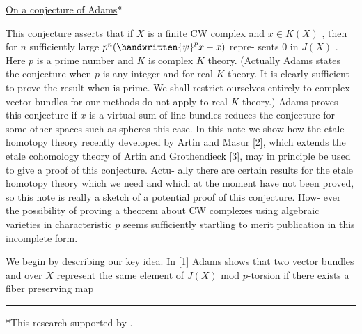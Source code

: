 
\begin{center}
\uline{On a conjecture of Adams}*

\end{center}

This conjecture asserts that if $X$ is a finite CW complex
and $x \in K(X)$ , then for $n$ sufficiently large $p^{n}(\handwritten{\psi}^{p}x - x)$ repre-%
sents $0$ in $J(X)$ . Here $p$ is a prime number and $K$ is complex
$K$ theory. (Actually Adams states the conjecture when $p$ is any
integer and for real $K$ theory. It is clearly sufficient to prove
the result when  is prime. We shall restrict ourselves entirely
to complex vector bundles for our methods do not apply to real $K$
theory.) Adams \handwritten{[1]} proves this conjecture if $x$ is a virtual sum
of line bundles  reduces the conjecture for some other spaces
such as spheres  this case. In this note we show how the etale
homotopy theory recently developed by Artin and Masur [2], which
extends the etale cohomology theory of Artin and Grothendieck [3],
may in principle be used to give a proof of this conjecture. Actu-%
ally there are certain results for the etale homotopy theory which
we need and which at the moment have not been proved, so this note
is really a sketch of a potential proof of this conjecture. How-%
ever the possibility of proving a theorem about CW complexes
using algebraic varieties in characteristic $p$ seems sufficiently
startling to merit publication in this incomplete form.

We begin by describing our key idea. In [1] Adams shows that
two vector bundles  and  over $X$ represent the same element
of $J(X)$ mod $p$-torsion if there exists a fiber preserving map

\noindent\rule{0.4\textwidth}{0.4pt}

*This research  supported  by 
 .


